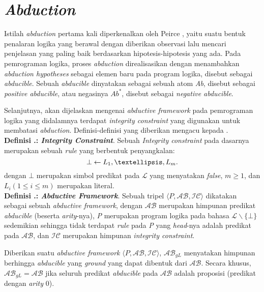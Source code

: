 \section{\textit{Abduction}}

Istilah \textit{abduction} pertama kali diperkenalkan oleh Peirce \citep{quine1933collected}, yaitu suatu bentuk penalaran logika yang berawal dengan diberikan observasi lalu mencari penjelasan yang paling baik berdasarkan hipotesis-hipotesis yang ada. Pada pemrograman logika, proses \textit{abduction} direalisasikan dengan menambahkan \textit{abduction hypotheses} sebagai elemen baru pada program logika, disebut sebagai \textit{abducible}. Sebuah \textit{abducible} dinyatakan sebagai sebuah atom \textit{Ab}, disebut sebagai \textit{positive abducible}, atau negasinya $Ab^*$, disebut sebagai \textit{negative abducible}.

Selanjutnya, akan dijelaskan mengenai \textit{abductive framework} pada pemrograman logika \citep{kakas1992abductive} yang didalamnya terdapat \textit{integrity constraint} yang digunakan untuk membatasi \textit{abduction}. Definisi-definisi yang diberikan mengacu kepada \citep{alferes2004abduction}.
\\

\noindent \textbf{Definisi \thebabDuaNum.\thedefBabDua: \textit{Integrity Constraint}}. Sebuah \textit{Integrity constraint} pada dasarnya merupakan sebuah \textit{rule} yang berbentuk penyangkalan:
\begin{displaymath}
\bot \leftarrow L_1, \textellipsis , L_m.
\end{displaymath}
dengan $\bot$ merupakan simbol predikat pada $\mathcal{L}$ yang menyatakan \textit{false}, $m \geq 1$, dan $L_i (1 \leq i \leq m)$ merupakan literal.
\\

\noindent \textbf{Definisi \thebabDuaNum.\thedefBabDua: \textit{Abductive Framework}}. Sebuah tripel $\langle P, \mathcal{AB}, \mathcal{IC} \rangle$ dikatakan sebagai sebuah \textit{abductive framework}, dengan $\mathcal{AB}$ merupakan himpunan predikat \textit{abducible} (beserta \textit{arity}-nya), \textit{P} merupakan program logika pada bahasa $\mathcal{L} \backslash \{\bot \}$ sedemikian sehingga tidak terdapat \textit{rule} pada \textit{P} yang \textit{head}-nya adalah predikat pada $\mathcal{AB}$, dan $\mathcal{IC}$ merupakan himpunan \textit{integrity constraint}.

Diberikan suatu \textit{abductive framework} $\langle P, \mathcal{AB}, \mathcal{IC} \rangle$, $\mathcal{AB}_{gL}$ menyatakan himpunan berhingga \textit{abducible} yang \textit{ground} yang dapat dibentuk dari $\mathcal{AB}$. Secara khusus, $\mathcal{AB}_{gL} = \mathcal{AB}$ jika seluruh predikat \textit{abducible} pada $\mathcal{AB}$ adalah proposisi (predikat dengan \textit{arity} 0).
\\

